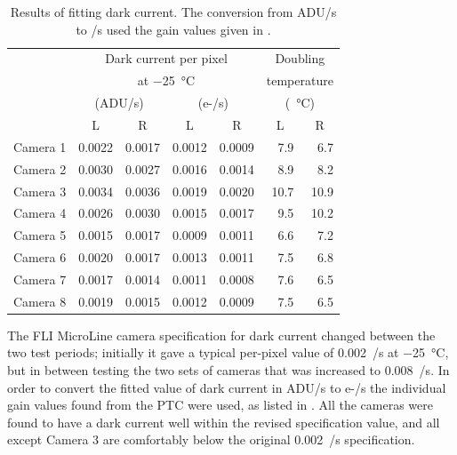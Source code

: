 \begin{colsection}
\begin{colsection}
\begin{table}[t]
    \begin{center}
        \begin{tabular}{c|cc|cc|rr} %
             &
            \multicolumn{4}{c|}{Dark current per pixel} &
            \multicolumn{2}{c}{Doubling} \\
             &
            \multicolumn{4}{c|}{at \SI{-25}{\celsius}} &
            \multicolumn{2}{c}{temperature} \\
             &
            \multicolumn{2}{c|}{(ADU/s)} &
            \multicolumn{2}{c|}{(e-/s)} &
            \multicolumn{2}{c}{(\SI{}{\celsius})} \\
             & L & R & L & R &
             \multicolumn{1}{c}{L} & \multicolumn{1}{c}{R} \\
            \midrule
            Camera 1 & 0.0022 & 0.0017 & 0.0012 & 0.0009 &  7.9 &  6.7 \\
            Camera 2 & 0.0030 & 0.0027 & 0.0016 & 0.0014 &  8.9 &  8.2 \\
            Camera 3 & 0.0034 & 0.0036 & 0.0019 & 0.0020 & 10.7 & 10.9 \\
            Camera 4 & 0.0026 & 0.0030 & 0.0015 & 0.0017 &  9.5 & 10.2 \\
            Camera 5 & 0.0015 & 0.0017 & 0.0009 & 0.0011 &  6.6 &  7.2 \\
            Camera 6 & 0.0020 & 0.0017 & 0.0013 & 0.0011 &  7.5 &  6.8 \\
            Camera 7 & 0.0017 & 0.0014 & 0.0011 & 0.0008 &  7.6 &  6.5 \\
            Camera 8 & 0.0019 & 0.0015 & 0.0012 & 0.0009 &  7.5 &  6.5 \\
        \end{tabular}
    \end{center}
    \caption[TODO]{
        Results of fitting dark current. The conversion from ADU/s to \elec/s used the gain values given in .
        }\label{tab:dc}
\end{table}

The FLI MicroLine camera specification for dark current changed between the two test periods; initially it gave a typical per-pixel value of 0.002~\elec/s at \SI{-25}{\celsius}, but in between testing the two sets of cameras that was increased to 0.008~\elec/s. In order to convert the fitted value of dark current in ADU/s to e-/s the individual gain values found from the PTC were used, as listed in . All the cameras were found to have a dark current well within the revised specification value, and all except Camera 3 are comfortably below the original 0.002~\elec/s specification.


\end{colsection}
\end{colsection}
